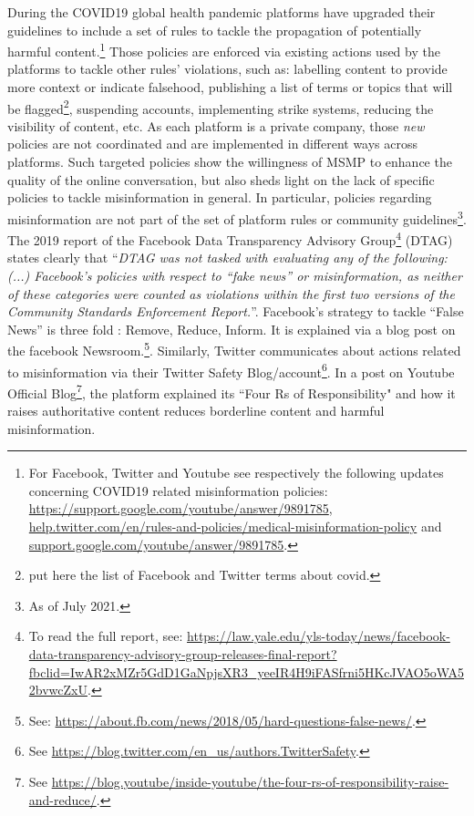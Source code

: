 \documentclass{article}
\begin{document}
During the COVID19 global health pandemic platforms have upgraded their guidelines to include a set of rules to tackle the propagation of potentially harmful content.\footnote{For Facebook, Twitter and Youtube see respectively the following updates concerning COVID19 related misinformation policies: \href{https://support.google.com/youtube/answer/9891785}{https://support.google.com/youtube/answer/9891785}, \href{https://help.twitter.com/en/rules-and-policies/medical-misinformation-policy}{help.twitter.com/en/rules-and-policies/medical-misinformation-policy} and \href{https://support.google.com/youtube/answer/9891785}{support.google.com/youtube/answer/9891785}.} Those policies are enforced via existing actions used by the platforms to tackle other rules' violations, such as: labelling content to provide more context or indicate falsehood, publishing a list of terms or topics that will be flagged\footnote{{\color{pink} put here the list of Facebook and Twitter terms about covid.}}, suspending accounts, implementing strike systems, reducing the visibility of content, etc. As each platform is a private company, those {\it new} policies are not coordinated and are implemented in different ways across platforms. Such targeted policies show the willingness of MSMP to enhance the quality of the online conversation, but also sheds light on the lack of specific policies to tackle misinformation in general. In particular, policies regarding misinformation are not part of the set of platform rules or community guidelines\footnote{As of July 2021.}. The 2019 report of the Facebook Data Transparency Advisory Group\footnote{To read the full report, see: \href{https://law.yale.edu/yls-today/news/facebook-data-transparency-advisory-group-releases-final-report?fbclid=IwAR2xMZr5GdD1GaNpjsXR3\_yeeIR4H9iFASfrni5HKcJVAO5oWA52bvwcZxU}{https://law.yale.edu/yls-today/news/facebook-data-transparency-advisory-group-releases-final-report?fbclid=IwAR2xMZr5GdD1GaNpjsXR3\_yeeIR4H9iFASfrni5HKcJVAO5oWA52bvwcZxU}.} (DTAG) states clearly that ``{\it DTAG was not tasked with evaluating any of the following: (...) Facebook’s policies with respect to “fake news” or misinformation, as neither of these categories were counted as violations within the first two versions of the Community Standards Enforcement Report.}''. Facebook's strategy to tackle ``False News'' is three fold : Remove, Reduce, Inform. It is explained via a blog post on the facebook Newsroom.\footnote{See: \href{https://about.fb.com/news/2018/05/hard-questions-false-news/}{https://about.fb.com/news/2018/05/hard-questions-false-news/}.}. Similarly, Twitter communicates about actions related to misinformation via their Twitter Safety Blog/account\footnote{See \href{https://blog.twitter.com/en\_us/authors.TwitterSafety}{https://blog.twitter.com/en\_us/authors.TwitterSafety}.}. In a post on Youtube Official Blog\footnote{See \href{https://blog.youtube/inside-youtube/the-four-rs-of-responsibility-raise-and-reduce/}{https://blog.youtube/inside-youtube/the-four-rs-of-responsibility-raise-and-reduce/}.}, the platform explained its ``Four Rs of Responsibility" and how it raises authoritative content reduces borderline content and harmful misinformation.  
\end{document}

